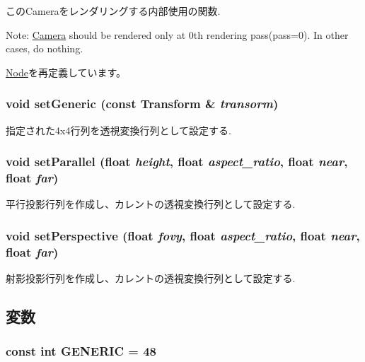 このCameraをレンダリングする内部使用の関数.

Note: \hyperlink{classm3g_1_1Camera}{Camera} should be rendered only at 0th rendering pass(pass=0). In other cases, do nothing. 

\hyperlink{classm3g_1_1Node_1efcb1973989d9963d5bd6d03065d389}{Node}を再定義しています。\hypertarget{classm3g_1_1Camera_51c42821097e90d3f59e87676684f60a}{
\subsubsection[{setGeneric}]{\setlength{\rightskip}{0pt plus 5cm}void setGeneric (const {\bf Transform} \& {\em transorm})}}
\label{classm3g_1_1Camera_51c42821097e90d3f59e87676684f60a}


指定された4x4行列を透視変換行列として設定する. \hypertarget{classm3g_1_1Camera_cb4535fd75b28b4d58390962d0c0e588}{
\subsubsection[{setParallel}]{\setlength{\rightskip}{0pt plus 5cm}void setParallel (float {\em height}, \/  float {\em aspect\_\-ratio}, \/  float {\em near}, \/  float {\em far})}}
\label{classm3g_1_1Camera_cb4535fd75b28b4d58390962d0c0e588}


平行投影行列を作成し、カレントの透視変換行列として設定する. \hypertarget{classm3g_1_1Camera_ca92a48ebe3424deac8e54c27550189d}{
\subsubsection[{setPerspective}]{\setlength{\rightskip}{0pt plus 5cm}void setPerspective (float {\em fovy}, \/  float {\em aspect\_\-ratio}, \/  float {\em near}, \/  float {\em far})}}
\label{classm3g_1_1Camera_ca92a48ebe3424deac8e54c27550189d}


射影投影行列を作成し、カレントの透視変換行列として設定する. 

\subsection{変数}
\hypertarget{classm3g_1_1Camera_48a4e153c97a1f4890558a77dfe02ca4}{
\subsubsection[{GENERIC}]{\setlength{\rightskip}{0pt plus 5cm}const int {\bf GENERIC} = 48}}
\label{classm3g_1_1Camera_48a4e153c97a1f4890558a77dfe02ca4}



